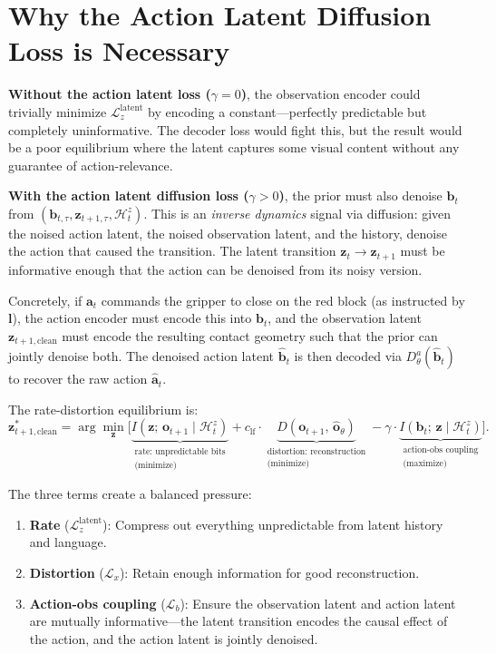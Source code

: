 \documentclass{article}
\newcommand{\vo}{\bm{o}}
\newcommand{\vz}{\bm{z}}
\newcommand{\va}{\bm{a}}
\newcommand{\vb}{\bm{b}}
\newcommand{\loss}{\mathcal{L}}
\begin{document}
\section{Why the Action Latent Diffusion Loss is Necessary}

\textbf{Without the action latent loss ($\gamma = 0$)}, the observation encoder could trivially minimize $\loss_z^{\text{latent}}$ by encoding a constant---perfectly predictable but completely uninformative.
The decoder loss would fight this, but the result would be a poor equilibrium where the latent captures some visual content without any guarantee of action-relevance.

\textbf{With the action latent diffusion loss ($\gamma > 0$)}, the prior must also denoise $\vb_t$ from $(\vb_{t,\tau}, \vz_{t+1,\tau}, \mathcal{H}_t^z)$.
This is an \emph{inverse dynamics} signal via diffusion: given the noised action latent, the noised observation latent, and the history, denoise the action that caused the transition.
The latent transition $\vz_t \to \vz_{t+1}$ must be informative enough that the action can be denoised from its noisy version.

Concretely, if $\va_t$ commands the gripper to close on the red block (as instructed by $\bm{l}$), the action encoder must encode this into $\vb_t$, and the observation latent $\vz_{t+1,\text{clean}}$ must encode the resulting contact geometry such that the prior can jointly denoise both.
The denoised action latent $\hat{\vb}_t$ is then decoded via $D_\theta^a(\hat{\vb}_t)$ to recover the raw action $\hat{\va}_t$.

The rate-distortion equilibrium is:
\begin{equation}
  \vz_{t+1,\text{clean}}^* = \arg\min_{\vz} \Big[
    \underbrace{I(\vz;\, \vo_{t+1} \mid \mathcal{H}_t^z)}_{\substack{\text{rate: unpredictable bits} \\ \text{(minimize)}}}
    + c_{\text{lf}} \cdot \underbrace{D(\vo_{t+1},\, \hat{\vo}_\theta)}_{\substack{\text{distortion: reconstruction} \\ \text{(minimize)}}}
    - \gamma \cdot \underbrace{I(\vb_t;\, \vz \mid \mathcal{H}_t^z)}_{\substack{\text{action-obs coupling} \\ \text{(maximize)}}}
  \Big].
  \label{eq:rd_action}
\end{equation}

The three terms create a balanced pressure:
\begin{enumerate}[leftmargin=*]
  \item \textbf{Rate} ($\loss_z^{\text{latent}}$): Compress out everything unpredictable from latent history and language.
  \item \textbf{Distortion} ($\loss_x$): Retain enough information for good reconstruction.
  \item \textbf{Action-obs coupling} ($\loss_b$): Ensure the observation latent and action latent are mutually informative---the latent transition encodes the causal effect of the action, and the action latent is jointly denoised.
\end{enumerate}
\end{document}
